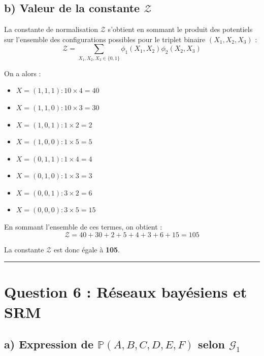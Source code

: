\documentclass{article}
\begin{document}
\begin{center}
\end{center}

\subsection*{b) Valeur de la constante $\mathcal{Z}$}

La constante de normalisation $\mathcal{Z}$ s'obtient en sommant le produit des potentiels sur l'ensemble des configurations possibles pour le triplet binaire $(X_1, X_2, X_3)$ :
\[ \mathcal{Z} = \sum_{X_1, X_2, X_3 \in \{0,1\}} \phi_1(X_1, X_2) \phi_2(X_2, X_3) \]

On a alors :
\begin{itemize}
    \item $X=(1,1,1) : 10 \times 4 = 40$
    \item $X=(1,1,0) : 10 \times 3 = 30$
    \item $X=(1,0,1) : 1 \times 2 = 2$
    \item $X=(1,0,0) : 1 \times 5 = 5$
    \item $X=(0,1,1) : 1 \times 4 = 4$
    \item $X=(0,1,0) : 1 \times 3 = 3$
    \item $X=(0,0,1) : 3 \times 2 = 6$
    \item $X=(0,0,0) : 3 \times 5 = 15$
\end{itemize}

En sommant l'ensemble de ces termes, on obtient :
\[ \mathcal{Z} = 40 + 30 + 2 + 5 + 4 + 3 + 6 + 15 = 105 \]

La constante $\mathcal{Z}$ est donc égale à \textbf{105}.

\vspace{1cm}
\hrule
\vspace{1cm}

\section*{Question 6 : Réseaux bayésiens et SRM}

\subsection*{a) Expression de $\mathbb{P}(A, B, C, D, E, F)$ selon $\mathcal{G}_1$}
\end{document}
